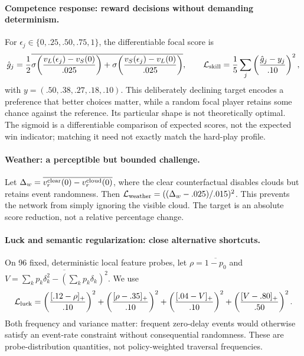 \paragraph{Competence response: reward decisions without demanding determinism.}
For $\epsilon_j\in\{0,.25,.50,.75,1\}$, the differentiable focal score is
\begin{equation}
 \hat g_j=\frac12\overline{\sigma\!\left(
 \frac{v_L(\epsilon_j)-v_S(0)}{.025}\right)
 +\sigma\!\left(\frac{v_S(\epsilon_j)-v_L(0)}{.025}\right)},\qquad
 \mathcal L_{\rm skill}=\frac15\sum_j\left(\frac{\hat g_j-y_j}{.10}\right)^2,
\end{equation}
with $y=(.50,.38,.27,.18,.10)$. This deliberately declining target encodes a
preference that better choices matter, while a random focal player retains some
chance against the reference. Its particular shape is not theoretically optimal.
The sigmoid is a differentiable comparison of expected scores, not the expected
win indicator; matching it need not exactly match the hard-play profile.

\paragraph{Weather: a perceptible but bounded challenge.}
Let $\Delta_w=\overline{v_r^{\rm clear}(0)-v_r^{\rm cloud}(0)}$, where the clear
counterfactual disables clouds but retains event randomness. Then
$\mathcal L_{\rm weather}=((\Delta_w-.025)/.015)^2$.
This prevents the network from simply ignoring the visible cloud. The target is
an absolute score reduction, not a relative percentage change.

\paragraph{Luck and semantic regularization: close alternative shortcuts.}
On 96 fixed, deterministic local feature probes, let $\rho=\overline{1-p_0}$ and
$V=\overline{\sum_kp_k\delta_k^2-(\sum_kp_k\delta_k)^2}$. We use
\begin{equation}
 \mathcal L_{\rm luck}=
 \left(\frac{[.12-\rho]_+}{.10}\right)^2+
 \left(\frac{[\rho-.35]_+}{.10}\right)^2+
 \left(\frac{[.04-V]_+}{.10}\right)^2+
 \left(\frac{[V-.80]_+}{.50}\right)^2.
\end{equation}
Both frequency and variance matter: frequent zero-delay events would otherwise
satisfy an event-rate constraint without consequential randomness. These are
probe-distribution quantities, not policy-weighted traversal frequencies.

